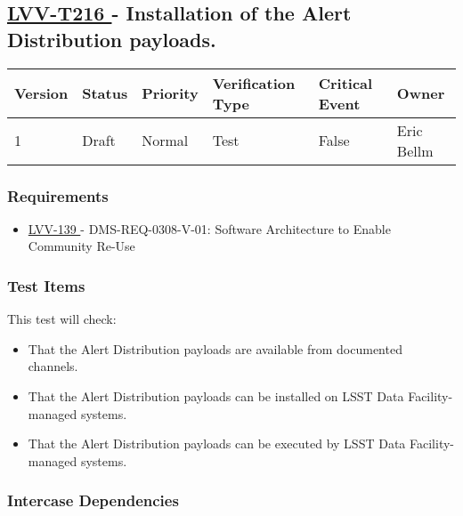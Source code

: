 



\subsection{ \href{https://jira.lsstcorp.org/secure/Tests.jspa\#/testCase/LVV-T216}{ LVV-T216 }
             - Installation of the Alert Distribution payloads. }\label{lvv-t216}





\begin{longtable}[]{llllll}
\toprule
Version & Status & Priority & Verification Type & Critical Event & Owner
\\\midrule
1 & Draft & Normal & Test & False & Eric Bellm
\\\bottomrule
\end{longtable}

\subsubsection{Requirements}

\begin{itemize}

\item \href{https://jira.lsstcorp.org/browse/LVV-139}{ LVV-139 } - DMS-REQ-0308-V-01: Software Architecture to Enable Community Re-Use

\end{itemize}


\subsubsection{Test Items}

This test will check:\\[2\baselineskip]

\begin{itemize}
\tightlist
\item
  That the Alert Distribution payloads are available from documented
  channels.
\item
  That the Alert Distribution payloads can be installed on LSST Data
  Facility-managed systems.
\item
  That the Alert Distribution payloads can be executed by LSST Data
  Facility-managed systems.
\end{itemize}





\subsubsection{Intercase Dependencies}


